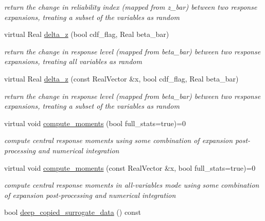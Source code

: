 \begin{DoxyCompactItemize}
\begin{DoxyCompactList}\small\item\em return the change in reliability index (mapped from z\+\_\+bar) between two response expansions, treating a subset of the variables as random \end{DoxyCompactList}\item 
virtual Real \hyperlink{classPecos_1_1PolynomialApproximation_a677b7ca69b5b17169b3f6e3ccb972ce6}{delta\+\_\+z} (bool cdf\+\_\+flag, Real beta\+\_\+bar)\label{classPecos_1_1PolynomialApproximation_a677b7ca69b5b17169b3f6e3ccb972ce6}

\begin{DoxyCompactList}\small\item\em return the change in response level (mapped from beta\+\_\+bar) between two response expansions, treating all variables as random \end{DoxyCompactList}\item 
virtual Real \hyperlink{classPecos_1_1PolynomialApproximation_a3280b1f280ca2af6d965d5562fc42770}{delta\+\_\+z} (const Real\+Vector \&x, bool cdf\+\_\+flag, Real beta\+\_\+bar)\label{classPecos_1_1PolynomialApproximation_a3280b1f280ca2af6d965d5562fc42770}

\begin{DoxyCompactList}\small\item\em return the change in response level (mapped from beta\+\_\+bar) between two response expansions, treating a subset of the variables as random \end{DoxyCompactList}\item 
virtual void \hyperlink{classPecos_1_1PolynomialApproximation_a1b63b514dc73ab12312bacfcdd7cdfc7}{compute\+\_\+moments} (bool full\+\_\+stats=true)=0\label{classPecos_1_1PolynomialApproximation_a1b63b514dc73ab12312bacfcdd7cdfc7}

\begin{DoxyCompactList}\small\item\em compute central response moments using some combination of expansion post-\/processing and numerical integration \end{DoxyCompactList}\item 
virtual void \hyperlink{classPecos_1_1PolynomialApproximation_acd777543cf4cc477dcf3a460778c4d96}{compute\+\_\+moments} (const Real\+Vector \&x, bool full\+\_\+stats=true)=0\label{classPecos_1_1PolynomialApproximation_acd777543cf4cc477dcf3a460778c4d96}

\begin{DoxyCompactList}\small\item\em compute central response moments in all-\/variables mode using some combination of expansion post-\/processing and numerical integration \end{DoxyCompactList}\item 
bool \hyperlink{classPecos_1_1PolynomialApproximation_aed1866c1996955f9ad44021dc97e6b00}{deep\+\_\+copied\+\_\+surrogate\+\_\+data} () const \label{classPecos_1_1PolynomialApproximation_aed1866c1996955f9ad44021dc97e6b00}


\end{DoxyCompactItemize}

